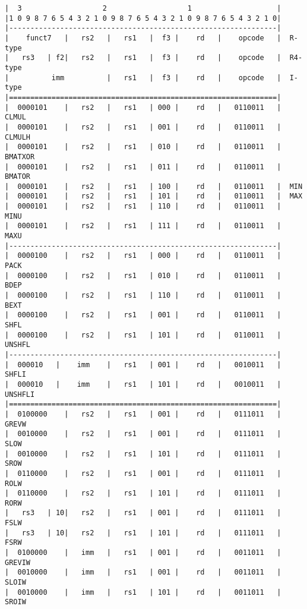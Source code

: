 \begin{minipage}{\linewidth}
\begin{verbatim}
|  3                   2                   1                    |
|1 0 9 8 7 6 5 4 3 2 1 0 9 8 7 6 5 4 3 2 1 0 9 8 7 6 5 4 3 2 1 0|
|---------------------------------------------------------------|
|    funct7   |   rs2   |   rs1   |  f3 |    rd   |    opcode   |  R-type
|   rs3   | f2|   rs2   |   rs1   |  f3 |    rd   |    opcode   |  R4-type
|          imm          |   rs1   |  f3 |    rd   |    opcode   |  I-type
|===============================================================|
|  0000101    |   rs2   |   rs1   | 000 |    rd   |   0110011   |  CLMUL
|  0000101    |   rs2   |   rs1   | 001 |    rd   |   0110011   |  CLMULH
|  0000101    |   rs2   |   rs1   | 010 |    rd   |   0110011   |  BMATXOR
|  0000101    |   rs2   |   rs1   | 011 |    rd   |   0110011   |  BMATOR
|  0000101    |   rs2   |   rs1   | 100 |    rd   |   0110011   |  MIN
|  0000101    |   rs2   |   rs1   | 101 |    rd   |   0110011   |  MAX
|  0000101    |   rs2   |   rs1   | 110 |    rd   |   0110011   |  MINU
|  0000101    |   rs2   |   rs1   | 111 |    rd   |   0110011   |  MAXU
|---------------------------------------------------------------|
|  0000100    |   rs2   |   rs1   | 000 |    rd   |   0110011   |  PACK
|  0000100    |   rs2   |   rs1   | 010 |    rd   |   0110011   |  BDEP
|  0000100    |   rs2   |   rs1   | 110 |    rd   |   0110011   |  BEXT
|  0000100    |   rs2   |   rs1   | 001 |    rd   |   0110011   |  SHFL
|  0000100    |   rs2   |   rs1   | 101 |    rd   |   0110011   |  UNSHFL
|---------------------------------------------------------------|
|  000010   |    imm    |   rs1   | 001 |    rd   |   0010011   |  SHFLI
|  000010   |    imm    |   rs1   | 101 |    rd   |   0010011   |  UNSHFLI
|===============================================================|
|  0100000    |   rs2   |   rs1   | 001 |    rd   |   0111011   |  GREVW
|  0010000    |   rs2   |   rs1   | 001 |    rd   |   0111011   |  SLOW
|  0010000    |   rs2   |   rs1   | 101 |    rd   |   0111011   |  SROW
|  0110000    |   rs2   |   rs1   | 001 |    rd   |   0111011   |  ROLW
|  0110000    |   rs2   |   rs1   | 101 |    rd   |   0111011   |  RORW
|   rs3   | 10|   rs2   |   rs1   | 001 |    rd   |   0111011   |  FSLW
|   rs3   | 10|   rs2   |   rs1   | 101 |    rd   |   0111011   |  FSRW
|  0100000    |   imm   |   rs1   | 001 |    rd   |   0011011   |  GREVIW
|  0010000    |   imm   |   rs1   | 001 |    rd   |   0011011   |  SLOIW
|  0010000    |   imm   |   rs1   | 101 |    rd   |   0011011   |  SROIW

\end{verbatim}
\end{minipage}
